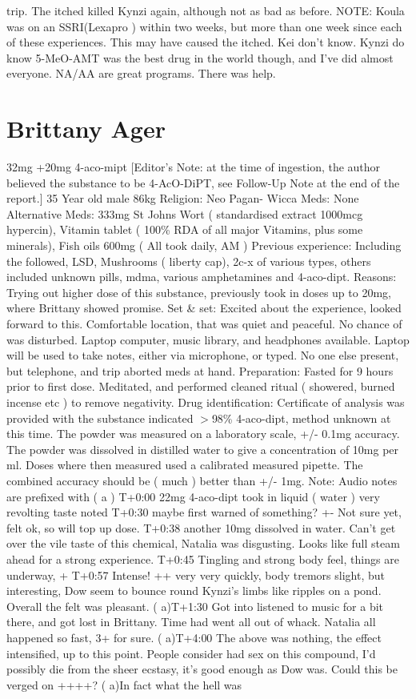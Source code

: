 \documentclass[12pt]{book}
\begin{document}
trip. The itched killed Kynzi again, although not as bad as before. NOTE: Koula was on an SSRI(Lexapro ) within two weeks, but more than one week since each of these experiences. This may have caused the itched. Kei don't know. Kynzi do know 5-MeO-AMT was the best drug in the world though, and I've did almost everyone. NA/AA are great programs. There was help.



\chapter{Brittany Ager}

32mg +20mg 4-aco-mipt [Editor's Note: at the time of ingestion, the author believed the substance to be 4-AcO-DiPT, see Follow-Up Note at the end of the report.] 35 Year old male 86kg Religion: Neo Pagan- Wicca Meds: None Alternative Meds: 333mg St Johns Wort ( standardised extract 1000mcg hypercin), Vitamin tablet ( 100\% RDA of all major Vitamins, plus some minerals), Fish oils 600mg ( All took daily, AM ) Previous experience: Including the followed, LSD, Mushrooms ( liberty cap), 2c-x of various types, others included unknown pills, mdma, various amphetamines and 4-aco-dipt. Reasons: Trying out higher dose of this substance, previously took in doses up to 20mg, where Brittany showed promise. Set \& set: Excited about the experience, looked forward to this. Comfortable location, that was quiet and peaceful. No chance of was disturbed. Laptop computer, music library, and headphones available. Laptop will be used to take notes, either via microphone, or typed. No one else present, but telephone, and trip aborted meds at hand. Preparation: Fasted for 9 hours prior to first dose. Meditated, and performed cleaned ritual ( showered, burned incense etc ) to remove negativity. Drug identification: Certificate of analysis was provided with the substance indicated $>$98\% 4-aco-dipt, method unknown at this time. The powder was measured on a laboratory scale, +/- 0.1mg accuracy. The powder was dissolved in distilled water to give a concentration of 10mg per ml. Doses where then measured used a calibrated measured pipette. The combined accuracy should be ( much ) better than +/- 1mg. Note: Audio notes are prefixed with ( a ) T+0:00 22mg 4-aco-dipt took in liquid ( water ) very revolting taste noted T+0:30 maybe first warned of something? +- Not sure yet, felt ok, so will top up dose. T+0:38 another 10mg dissolved in water. Can't get over the vile taste of this chemical, Natalia was disgusting. Looks like full steam ahead for a strong experience. T+0:45 Tingling and strong body feel, things are underway, + T+0:57 Intense! ++ very very quickly, body tremors slight, but interesting, Dow seem to bounce round Kynzi's limbs like ripples on a pond. Overall the felt was pleasant. ( a)T+1:30 Got into listened to music for a bit there, and got lost in Brittany. Time had went all out of whack. Natalia all happened so fast, 3+ for sure. ( a)T+4:00 The above was nothing, the effect intensified, up to this point. People consider had sex on this compound, I'd possibly die from the sheer ecstasy, it's good enough as Dow was. Could this be verged on ++++? ( a)In fact what the hell was 
\end{document}
